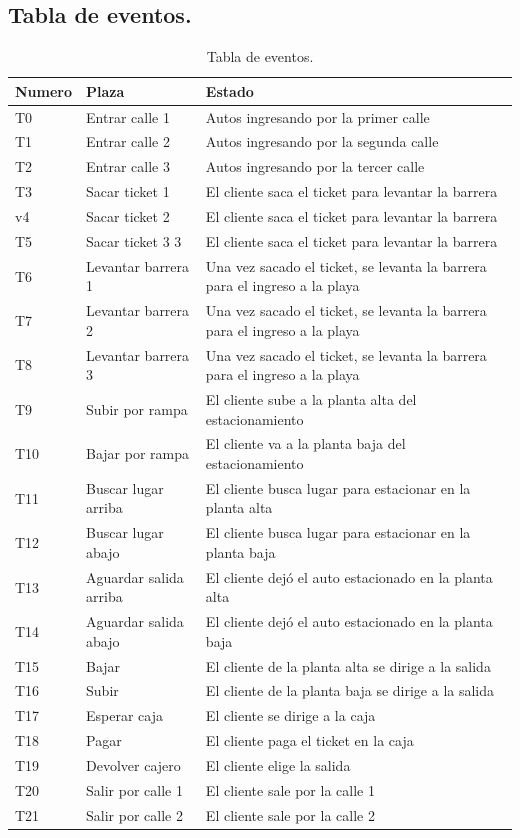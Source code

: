 \documentclass[12pt,a4paper]{article}
\begin{document}
\subsection{Tabla de eventos.}
\begin{table}[H]
\centering
\begin{tabular}[width=15cm]{ || C{1.5cm} | L{5cm} | L{8.5cm} || }
\hline
	Numero & Plaza & Estado  \\ \hline
	T0 & Entrar calle 1 & Autos ingresando por la primer calle  \\ \hline
	T1 & Entrar calle 2 & Autos ingresando por la segunda calle \\ \hline
	T2 & Entrar calle 3 & Autos ingresando por la tercer calle \\ \hline
	T3 & Sacar ticket 1 & El cliente saca el ticket para levantar la barrera  \\ \hline
	v4 & Sacar ticket 2 & El cliente saca el ticket para levantar la barrera \\ \hline
	T5 & Sacar ticket 3 3 & El cliente saca el ticket para levantar la barrera \\ \hline
	T6 & Levantar barrera 1 & Una vez sacado el ticket, se levanta la barrera para el ingreso a la playa  \\ \hline
	T7 & Levantar barrera 2 & Una vez sacado el ticket, se levanta la barrera para el ingreso a la playa   \\ \hline
	T8 & Levantar barrera 3 & Una vez sacado el ticket, se levanta la barrera para el ingreso a la playa  \\ \hline
	T9 & Subir por rampa & El cliente sube a la planta alta del estacionamiento   \\ \hline
	T10 & Bajar por rampa & El cliente va a la planta baja del estacionamiento  \\ \hline
	T11 & Buscar lugar arriba & El cliente busca lugar para estacionar en la planta alta  \\ \hline
	T12 & Buscar lugar abajo & El cliente busca lugar para estacionar en la planta baja  \\ \hline
	T13 & Aguardar salida arriba & El cliente dejó el auto estacionado en la planta alta \\ \hline
	T14 & Aguardar salida abajo & El cliente dejó el auto estacionado en la planta baja \\ \hline
	T15 & Bajar & El cliente de la planta alta se dirige a la salida \\ \hline
	T16 & Subir & El cliente de la planta baja se dirige a la salida  \\ \hline
	T17 & Esperar caja & El cliente se dirige a la caja  \\ \hline
	T18 & Pagar & El cliente paga el ticket en la caja  \\ \hline
	T19 & Devolver cajero & El cliente elige la salida \\ \hline
	T20 & Salir por calle 1 & El cliente sale por la calle 1  \\ \hline
	T21 & Salir por calle 2 & El cliente sale por la calle 2   \\ \hline
\end{tabular}
\caption{Tabla de eventos.}
\label{table:plazas}
\end{table}
\end{document}
